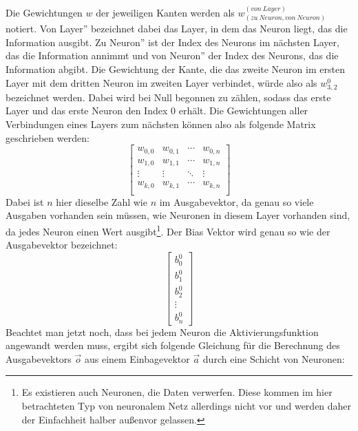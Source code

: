 \documentclass[11pt]{article}
\begin{document}
Die Gewichtungen $w$ der jeweiligen Kanten werden als $w^{(von\ Layer)}_{(zu\ Neuron, von\ Neuron)}$ notiert. \glqq Von Layer'' bezeichnet dabei das Layer, in dem das Neuron liegt, das die Information ausgibt. \glqq Zu Neuron'' ist der Index des Neurons im nächsten Layer, das die Information annimmt und \glqq von Neuron'' der Index des Neurons, das die Information abgibt. Die Gewichtung der Kante, die das zweite Neuron im ersten Layer mit dem dritten Neuron im zweiten Layer verbindet, würde also als $w^0_{3,2}$ bezeichnet werden. Dabei wird bei Null begonnen zu zählen, sodass das erste Layer und das erste Neuron den Index 0 erhält.\newline
Die Gewichtungen aller Verbindungen eines Layers zum nächsten können also als folgende Matrix geschrieben werden:
\begin{equation*}
	\begin{bmatrix}
	w_{0,0} & w_{0,1} & \cdots & w_{0,n}\\
	w_{1,0} & w_{1,1} & \cdots & w_{1,n}\\
	\vdots & \vdots & \ddots & \vdots\\
	w_{k,0} & w_{k,1} & \cdots & w_{k,n}\\
	\end{bmatrix}
\end{equation*}
Dabei ist $n$ hier dieselbe Zahl wie $n$ im Ausgabevektor, da genau so viele Ausgaben vorhanden sein müssen, wie Neuronen in diesem Layer vorhanden sind, da jedes Neuron einen Wert ausgibt\footnote{Es existieren auch Neuronen, die Daten verwerfen. Diese kommen im hier betrachteten Typ von neuronalem Netz allerdings nicht vor und werden daher der Einfachheit halber außenvor gelassen.}. Der Bias Vektor wird genau so wie der Ausgabevektor bezeichnet:
\begin{equation*}
\begin{bmatrix}
	b^0_0\\
	b^0_1\\
	b^0_2\\
	\vdots\\
	b^0_n
\end{bmatrix}
\end{equation*}
Beachtet man jetzt noch, dass bei jedem Neuron die Aktivierungsfunktion angewandt werden muss, ergibt sich folgende Gleichung für die Berechnung des Ausgabevektors $\vec{o}$ aus einem Einbagevektor $\vec{a}$ durch eine Schicht von Neuronen:
\end{document}

